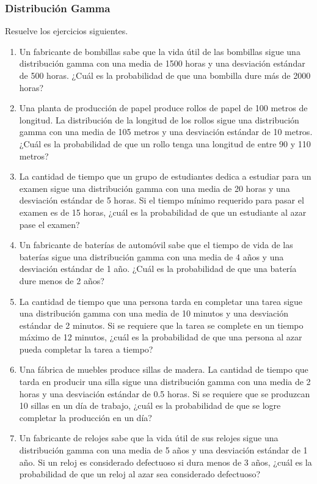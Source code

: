 \subsubsection{Distribución Gamma}
\begin{Ejer}  Resuelve los ejercicios siguientes.

\begin{enumerate}
    \item Un fabricante de bombillas sabe que la vida útil de las bombillas sigue una distribución gamma con una media de 1500 horas y una desviación estándar de 500 horas. ¿Cuál es la probabilidad de que una bombilla dure más de 2000 horas?
    \item Una planta de producción de papel produce rollos de papel de 100 metros de longitud. La distribución de la longitud de los rollos sigue una distribución gamma con una media de 105 metros y una desviación estándar de 10 metros. ¿Cuál es la probabilidad de que un rollo tenga una longitud de entre 90 y 110 metros?
    \item La cantidad de tiempo que un grupo de estudiantes dedica a estudiar para un examen sigue una distribución gamma con una media de 20 horas y una desviación estándar de 5 horas. Si el tiempo mínimo requerido para pasar el examen es de 15 horas, ¿cuál es la probabilidad de que un estudiante al azar pase el examen?
    \item Un fabricante de baterías de automóvil sabe que el tiempo de vida de las baterías sigue una distribución gamma con una media de 4 años y una desviación estándar de 1 año. ¿Cuál es la probabilidad de que una batería dure menos de 2 años?
    \item La cantidad de tiempo que una persona tarda en completar una tarea sigue una distribución gamma con una media de 10 minutos y una desviación estándar de 2 minutos. Si se requiere que la tarea se complete en un tiempo máximo de 12 minutos, ¿cuál es la probabilidad de que una persona al azar pueda completar la tarea a tiempo?
    \item Una fábrica de muebles produce sillas de madera. La cantidad de tiempo que tarda en producir una silla sigue una distribución gamma con una media de 2 horas y una desviación estándar de 0.5 horas. Si se requiere que se produzcan 10 sillas en un día de trabajo, ¿cuál es la probabilidad de que se logre completar la producción en un día?
    \item Un fabricante de relojes sabe que la vida útil de sus relojes sigue una distribución gamma con una media de 5 años y una desviación estándar de 1 año. Si un reloj es considerado defectuoso si dura menos de 3 años, ¿cuál es la probabilidad de que un reloj al azar sea considerado defectuoso?

\end{enumerate}
\end{Ejer}
